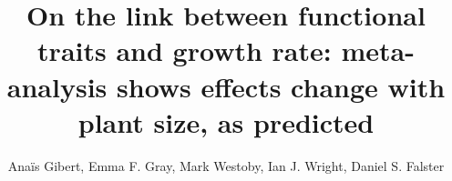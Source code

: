 
\newcommand{\smurl}[1]{\url{#1}}
\newcommand{\ud}{\ensuremath{\rm{d}}}
\newcommand{\tabitem}{~~\llap{\textbullet}~~}
\newcommand{\email}[1]{\href{mailto:#1}{\texttt{#1}}}

\title{On the link between functional traits and growth rate: meta-analysis shows effects change with plant size, as predicted}
\author{Ana{\"i}s Gibert\textasteriskcentered, Emma F. Gray, Mark Westoby, Ian J. Wright, Daniel S. Falster}

